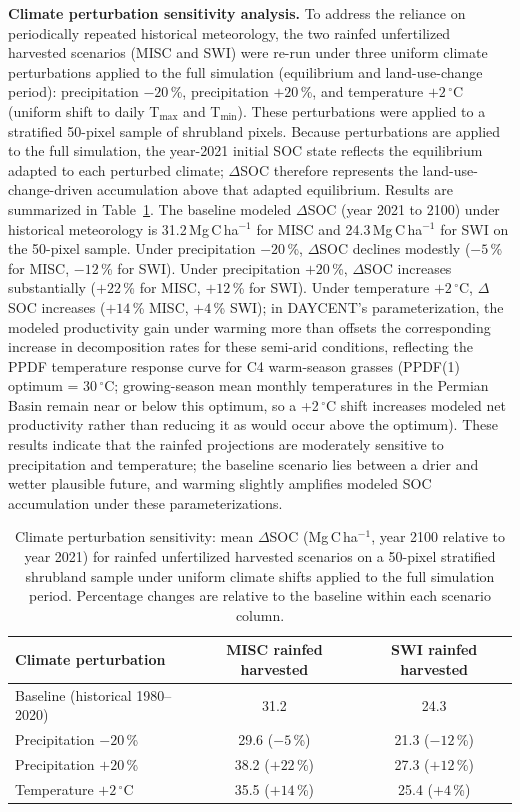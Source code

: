 \documentclass[11pt]{article}
\begin{document}
\textbf{Climate perturbation sensitivity analysis.} To address the reliance on periodically repeated historical meteorology, the two rainfed unfertilized harvested scenarios (MISC and SWI) were re-run under three uniform climate perturbations applied to the full simulation (equilibrium and land-use-change period): precipitation $-20$\,\%, precipitation $+20$\,\%, and temperature $+2$\,$^\circ$C (uniform shift to daily T$_\text{max}$ and T$_\text{min}$). These perturbations were applied to a stratified 50-pixel sample of shrubland pixels. Because perturbations are applied to the full simulation, the year-2021 initial SOC state reflects the equilibrium adapted to each perturbed climate; $\Delta$SOC therefore represents the land-use-change-driven accumulation above that adapted equilibrium. Results are summarized in Table~\ref{tab:climate_sensitivity}. The baseline modeled $\Delta$SOC (year 2021 to 2100) under historical meteorology is 31.2\,Mg\,C\,ha$^{-1}$ for MISC and 24.3\,Mg\,C\,ha$^{-1}$ for SWI on the 50-pixel sample. Under precipitation $-20$\,\%, $\Delta$SOC declines modestly ($-5$\,\% for MISC, $-12$\,\% for SWI). Under precipitation $+20$\,\%, $\Delta$SOC increases substantially ($+22$\,\% for MISC, $+12$\,\% for SWI). Under temperature $+2$\,$^\circ$C, $\Delta$SOC increases ($+14$\,\% MISC, $+4$\,\% SWI); in DAYCENT's parameterization, the modeled productivity gain under warming more than offsets the corresponding increase in decomposition rates for these semi-arid conditions, reflecting the PPDF temperature response curve for C4 warm-season grasses (PPDF(1) optimum = 30\,$^\circ$C; growing-season mean monthly temperatures in the Permian Basin remain near or below this optimum, so a +2\,$^\circ$C shift increases modeled net productivity rather than reducing it as would occur above the optimum). These results indicate that the rainfed projections are moderately sensitive to precipitation and temperature; the baseline scenario lies between a drier and wetter plausible future, and warming slightly amplifies modeled SOC accumulation under these parameterizations.

\begin{table}[h]
\centering
\caption{Climate perturbation sensitivity: mean $\Delta$SOC (Mg\,C\,ha$^{-1}$, year 2100 relative to year 2021) for rainfed unfertilized harvested scenarios on a 50-pixel stratified shrubland sample under uniform climate shifts applied to the full simulation period. Percentage changes are relative to the baseline within each scenario column.}
\label{tab:climate_sensitivity}
\begin{tabular}{lcc}
\hline
\textbf{Climate perturbation} & \textbf{MISC rainfed harvested} & \textbf{SWI rainfed harvested} \\
\hline
Baseline (historical 1980--2020) & 31.2 & 24.3 \\
Precipitation $-20$\,\%          & 29.6 ($-5$\,\%) & 21.3 ($-12$\,\%) \\
Precipitation $+20$\,\%          & 38.2 ($+22$\,\%) & 27.3 ($+12$\,\%) \\
Temperature $+2$\,$^\circ$C      & 35.5 ($+14$\,\%) & 25.4 ($+4$\,\%) \\
\hline
\end{tabular}
\end{table}
\end{document}
